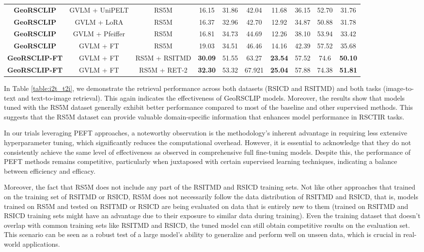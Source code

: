 \documentclass[journal]{IEEEtran}
\begin{document}
\begin{table*}
\begin{tabular}{cccccccccc}
\textbf{GeoRSCLIP}  &GVLM + UniPELT& RS5M & 16.15  & 31.86   & 42.04  & 11.68  &  36.15  & 52.70   &31.76  \\
\textbf{GeoRSCLIP}  &GVLM + LoRA& RS5M &  16.37  & 32.96  & 42.70  & 12.92   &34.87  & 50.88   &31.78  \\
\textbf{GeoRSCLIP}   &GVLM + Pfeiffer & RS5M & 16.81  &34.73  & 44.69   &  12.26  &  38.10  & 53.94  & 33.42 \\
\textbf{GeoRSCLIP}  & GVLM + FT & RS5M & 19.03  & 	34.51  & 	46.46 	 & 14.16 	&  42.39  & 	57.52   & 	35.68 \\
\textbf{GeoRSCLIP-FT}  & GVLM + FT & RS5M + RSITMD & \textbf{30.09} & 51.55 & 63.27 & \textbf{23.54} &57.52&74.6 & \textbf{50.10}  \\
\textbf{GeoRSCLIP-FT}  & GVLM + FT & RS5M + RET-2 &\textbf{32.30} &53.32&67.921&\textbf{25.04}&57.88&74.38 & \textbf{51.81}  \\
\bottomrule
\end{tabular}
\end{table*}

In Table \ref{table:i2t_t2i}, we demonstrate the retrieval performance across both datasets (RSICD and RSITMD) and both tasks (image-to-text and text-to-image retrieval). This again indicates the effectiveness of GeoRSCLIP models. Moreover, the results show that models tuned with the RS5M dataset generally exhibit better performance compared to most of the baseline and other supervised methods. This suggests that the RS5M dataset can provide valuable domain-specific information that enhances model performance in RSCTIR tasks. 

In our trials leveraging PEFT approaches, a noteworthy observation is the methodology's inherent advantage in requiring less extensive hyperparameter tuning, which significantly reduces the computational overhead. However, it is essential to acknowledge that they do not consistently achieve the same level of effectiveness as observed in comprehensive full fine-tuning models. Despite this, the performance of PEFT methods remains competitive, particularly when juxtaposed with certain supervised learning techniques, indicating a balance between efficiency and efficacy. 

Moreover, the fact that RS5M does not include any part of the RSITMD and RSICD training sets. Not like other approaches that trained on the training set of RSITMD or RSICD, RS5M does not necessarily follow the data distribution of RSITMD and RSICD, that is, models trained on RS5M and tested on RSITMD or RSICD are being evaluated on data that is entirely new to them (trained on RSITMD and RSICD training sets might have an advantage due to their exposure to similar data during training). 
Even the training dataset that doesn't overlap with common training sets like RSITMD and RSICD, the tuned model can still obtain competitive results on the evaluation set. This scenario can be seen as a robust test of a large model's ability to generalize and perform well on unseen data, which is crucial in real-world applications. 
\end{document}

